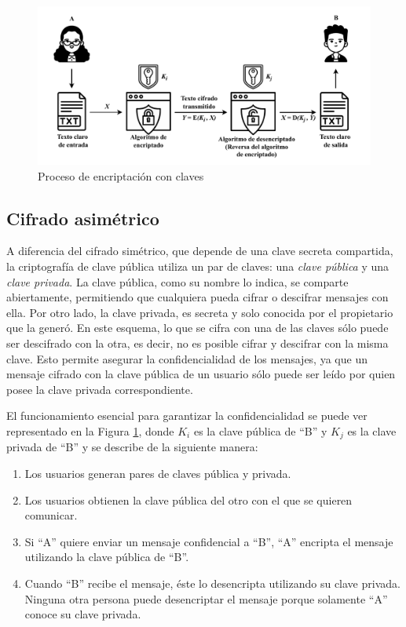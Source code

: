 \begin{figure}
    \centering
    \includegraphics[width=1\linewidth]{Imagenes/Seguridad de las comunicaciones/Cifrado simetrico y asimetrico.pdf}
    \caption{Proceso de encriptación con claves}
    \label{fig:procesoCifrado}
\end{figure}

\subsection{Cifrado asimétrico}
A diferencia del cifrado simétrico, que depende de una clave secreta compartida, la criptografía de clave pública utiliza un par de claves: una \textit{clave pública} y una \textit{clave privada}. La clave pública, como su nombre lo indica, se comparte abiertamente, permitiendo que cualquiera pueda cifrar o descifrar mensajes con ella. Por otro lado, la clave privada, es secreta y solo conocida por el propietario que la generó. En este esquema, lo que se cifra con una de las claves sólo puede ser descifrado con la otra, es decir, no es posible cifrar y descifrar con la misma clave. Esto permite asegurar la confidencialidad de los mensajes, ya que un mensaje cifrado con la clave pública de un usuario sólo puede ser leído por quien posee la clave privada correspondiente.

El funcionamiento esencial para garantizar la confidencialidad se puede ver representado en la Figura \ref{fig:procesoCifrado}, donde $K_i$ es la clave pública de ``B'' y $K_j$ es la clave privada de ``B'' y se describe de la siguiente manera:
\begin{enumerate}
    \item Los usuarios generan pares de claves pública y privada. 
    
    \item Los usuarios obtienen la clave pública del otro con el que se quieren comunicar.

    \item Si ``A'' quiere enviar un mensaje confidencial a ``B'', ``A'' encripta el mensaje utilizando la clave pública de ``B''.

    \item Cuando ``B'' recibe el mensaje, éste lo desencripta utilizando su clave privada. Ninguna otra persona puede desencriptar el mensaje porque solamente ``A'' conoce su clave privada. 
\end{enumerate}

